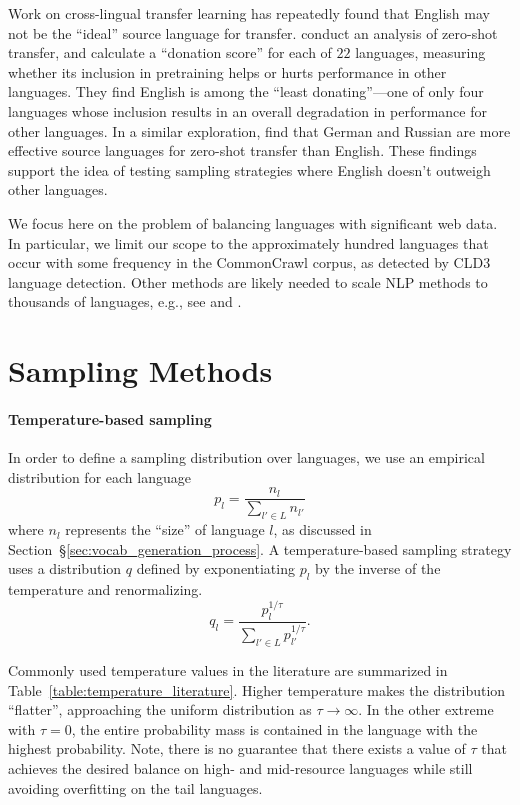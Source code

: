\documentclass{article} %
\begin{document}
Work on cross-lingual transfer learning has repeatedly found that English may not be the ``ideal'' source language for transfer. \citet{malkin-etal-2022-balanced} conduct an analysis of zero-shot transfer, and calculate a ``donation score'' for each of $22$ languages, measuring whether its inclusion in pretraining helps or hurts performance in other languages.  They find English is among the ``least donating''---one of only four languages whose inclusion results in an overall degradation in performance for other languages. In a similar exploration, \citet{turk2021revisiting} find that German and Russian are more effective source languages for zero-shot transfer than English. These findings support the idea of testing sampling strategies where English doesn't outweigh other languages.

We focus here on the problem of balancing languages with significant web data. In particular, we limit our scope to the approximately hundred languages that occur with some frequency in the CommonCrawl corpus, as detected by CLD3 language detection. Other methods are likely needed to scale NLP methods to thousands of languages, e.g., see \citet{wang-etal-2022-expanding} and \citet{bapna2022ntl}.

\section{Sampling Methods}
\label{sec:sampling_methods}

\paragraph{Temperature-based sampling}

In order to define a sampling distribution over languages, we use an empirical distribution for each language
%
\begin{equation}
    p_{l} = \frac{n_{l}}{\sum_{l' \in L} n_{l'}}
\end{equation}
%
where $n_l$ represents the ``size'' of language $l$, as discussed in Section~\S\ref{sec:vocab_generation_process}. A temperature-based sampling strategy uses a distribution $q$ defined by exponentiating $p_{l}$ by the inverse of the temperature and renormalizing.
\begin{equation}
    q_{l} = \frac{p_{l}^{1/\tau}}{\sum_{l' \in L} p_{l'}^{1/\tau}}.
\end{equation}

Commonly used temperature values in the literature are summarized in Table~\ref{table:temperature_literature}. Higher temperature makes the distribution ``flatter'', approaching the uniform distribution as $\tau \to \infty$. In the other extreme with $\tau = 0$, the entire probability mass is contained in the language with the highest probability. Note, there is no guarantee that there exists a value of $\tau$ that achieves the desired balance on high- and mid-resource languages while still avoiding overfitting on the tail languages.
\end{document}
